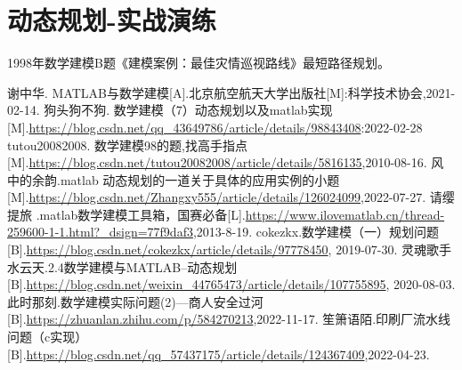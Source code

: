 \documentclass[a4paper,20pt]{article}
\begin{document}
\section{动态规划-实战演练}
1998年数学建模B题《建模案例：最佳灾情巡视路线》最短路径规划。

\newpage
\begin{thebibliography}{99}

    谢中华. MATLAB与数学建模[A].北京航空航天大学出版社[M]:科学技术协会,2021-02-14.
    狗头狗不狗. 数学建模（7）动态规划以及matlab实现[M].\url{https://blog.csdn.net/qq_43649786/article/details/98843408}:2022-02-28
    tutou20082008. 数学建模98的题,找高手指点[M].\url{https://blog.csdn.net/tutou20082008/article/details/5816135},2010-08-16.
    风中的余韵.matlab 动态规划的一道关于具体的应用实例的小题[M].\url{https://blog.csdn.net/Zhangxy555/article/details/126024099},2022-07-27.
    请缨提旅 .matlab数学建模工具箱，国赛必备[L].\url{https://www.ilovematlab.cn/thread-259600-1-1.html?_dsign=77f9daf3},2013-8-19.
    cokezkx.数学建模（一）规划问题[B].\url{https://blog.csdn.net/cokezkx/article/details/97778450}, 2019-07-30.
    灵魂歌手水云天.2.4数学建模与MATLAB--动态规划[B].\url{https://blog.csdn.net/weixin_44765473/article/details/107755895}, 2020-08-03.
    此时那刻.数学建模实际问题(2)---商人安全过河[B].\url{https://zhuanlan.zhihu.com/p/584270213},2022-11-17.
    笙箫语陌.印刷厂流水线问题（c实现）[B].\url{https://blog.csdn.net/qq_57437175/article/details/124367409},2022-04-23.
\end{thebibliography}
\newpage
\end{document}
